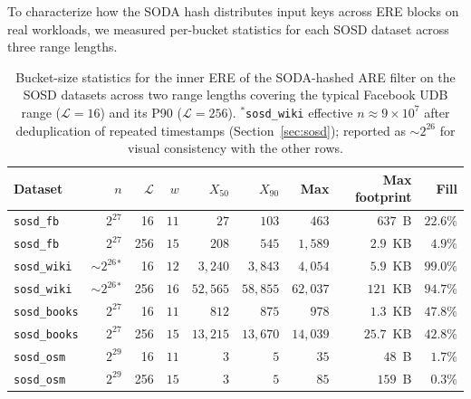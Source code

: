 To characterize how the SODA hash distributes input keys across ERE
blocks on real workloads, we measured per-bucket statistics for each
SOSD dataset across three range lengths.

\begin{table}[H]
    \centering
    \setlength{\tabcolsep}{9pt}
    \begin{tabular}{@{}lrrrrrrrr@{}}
        \toprule
        Dataset              & $n$                  & $\mathcal{L}$ & $w$  & $X_{50}$   & $X_{90}$   & Max        & Max footprint & Fill              \\
        \midrule
        \texttt{sosd\_fb}    & $2^{27}$             & 16            & $11$ & $27$       & $103$      & $463$      & $637$~B       & $22.6\%$          \\
        \texttt{sosd\_fb}    & $2^{27}$             & 256           & $15$ & $208$      & $545$      & $1{,}589$  & $2.9$~KB      & $4.9\%$           \\
        \texttt{sosd\_wiki}  & ${\sim}2^{26}{}^{*}$ & 16            & $12$ & $3{,}240$  & $3{,}843$  & $4{,}054$  & $5.9$~KB  & $\mathbf{99.0\%}$ \\
        \texttt{sosd\_wiki}  & ${\sim}2^{26}{}^{*}$ & 256           & $16$ & $52{,}565$ & $58{,}855$ & $62{,}037$   & $121$~KB   & $\mathbf{94.7\%}$ \\
        \texttt{sosd\_books} & $2^{27}$             & 16            & $11$ & $812$      & $875$      & $978$      & $1.3$~KB      & $47.8\%$          \\
        \texttt{sosd\_books} & $2^{27}$             & 256           & $15$ & $13{,}215$ & $13{,}670$ & $14{,}039$ & $25.7$~KB  & $42.8\%$ \\
        \texttt{sosd\_osm}   & $2^{29}$             & 16            & $11$ & $3$        & $5$        & $35$       & $48$~B        & $1.7\%$           \\
        \texttt{sosd\_osm}   & $2^{29}$             & 256           & $15$ & $3$        & $5$        & $85$       & $159$~B       & $0.3\%$           \\
        \bottomrule
    \end{tabular}
    \caption{Bucket-size statistics for the inner ERE of the SODA-hashed ARE
    filter on the SOSD datasets across two range lengths covering the
    typical Facebook UDB range ($\mathcal{L} = 16$) and its P90
        ($\mathcal{L} = 256$).
        $^{*}$\texttt{sosd\_wiki} effective $n \approx 9 \times 10^{7}$ after
        deduplication of repeated timestamps (Section~\ref{sec:sosd}); reported
        as ${\sim}2^{26}$ for visual consistency with the other rows.}
    \label{tab:eval-bucket-fill}


\end{table}

